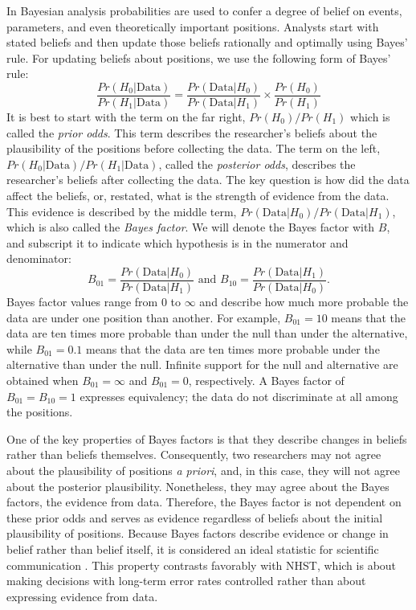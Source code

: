 \documentclass[man]{apa6}
\begin{document}
\nocite{Laplace:1986,Morey:Rouder:2014}

In Bayesian analysis probabilities are used to confer a degree of belief on events, parameters, and even theoretically important positions.  Analysts start with stated beliefs and then update those beliefs rationally and optimally using Bayes' rule.  For updating beliefs about positions, we use the following form of Bayes' rule:
\begin{equation}
\frac{Pr(H_0 | \mbox{Data})}{Pr(H_1 | \mbox{Data})} = \frac{Pr(\mbox{Data} | H_0)}{Pr(\mbox{Data} | H_1)} \times \frac{Pr(H_0)}{Pr (H_1)} 
\end{equation}
It is best to start with the term on the far right, $Pr(H_0)/Pr(H_1)$ which is called the {\em prior odds}.  This term describes the researcher's beliefs about the plausibility of the positions before collecting the data.  The term on the left, $Pr(H_0 | \mbox{Data})/Pr(H_1 | \mbox{Data})$, called the {\em posterior odds}, describes the researcher's beliefs after collecting the data.   The key question is how did the data affect the beliefs, or, restated, what is the strength of evidence from the data.  This evidence is described by the middle term,  $Pr(\mbox{Data} | H_0)/Pr(\mbox{Data} | H_1)$, which is also called the {\em Bayes factor}.  We will denote the Bayes factor with $B$, and subscript it to indicate which hypothesis is in the numerator and denominator:
\[
B_{01} = \frac{Pr(\mbox{Data} | H_0)}{Pr(\mbox{Data} | H_1)} \mbox{ and } B_{10} = \frac{Pr(\mbox{Data} | H_1)}{Pr(\mbox{Data} | H_0)}.
\]
Bayes factor values range from 0 to $\infty$ and describe how much more probable the data are under one position than another.  For example, $B_{01}=10$ means that the data are ten times more probable than under the null than under the alternative, while $B_{01}=0.1$ means that the data are ten times more probable under the alternative than under the null.  Infinite support for the null and alternative are obtained when $B_{01}=\infty$ and $B_{01}=0$, respectively.  A Bayes factor of $B_{01}=B_{10}=1$ expresses equivalency; the data do not discriminate at all among the positions.

One of the key properties of Bayes factors is that they describe changes in beliefs rather than beliefs themselves.  Consequently, two researchers may not agree about the plausibility of positions {\em a priori}, and, in this case, they will not agree about the posterior plausibility.  Nonetheless, they may agree about the Bayes factors, the evidence from data.  Therefore, the Bayes factor is not dependent on these prior odds and serves as evidence regardless of beliefs about the initial plausibility of positions.  Because Bayes factors describe evidence or change in belief rather than belief itself, it is considered an ideal statistic for scientific communication \citep{Jeffreys:1961}.  This property contrasts favorably with NHST, which is about making decisions with long-term error rates controlled rather than about expressing evidence from data. 
\end{document}
